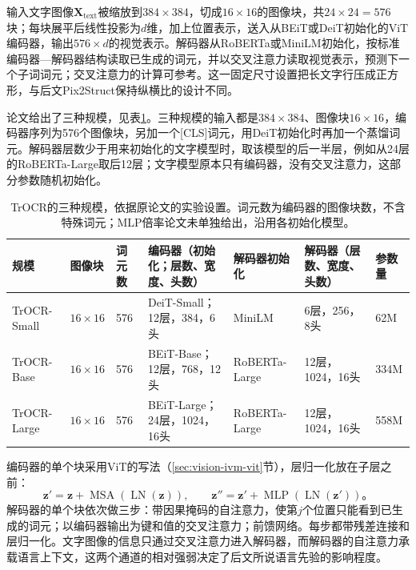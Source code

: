 输入文字图像$\bm X_{\mathrm{text}}$被缩放到$384\times384$，切成$16\times16$的图像块，共$24\times24=576$块；每块展平后线性投影为$d$维，加上位置表示，送入从BEiT或DeiT初始化的ViT编码器，输出$576\times d$的视觉表示。解码器从RoBERTa或MiniLM初始化，按标准编码器—解码器结构读取已生成的词元，并以交叉注意力读取视觉表示，预测下一个子词词元；交叉注意力的计算可参考。这一固定尺寸设置把长文字行压成正方形，与后文Pix2Struct保持纵横比的设计不同。

论文给出了三种规模，见表\ref{tab:vision-understanding-trocr-config}。三种规模的输入都是$384\times384$、图像块$16\times16$，编码器序列为576个图像块，另加一个[CLS]词元，用DeiT初始化时再加一个蒸馏词元。解码器层数少于用来初始化的文字模型时，取该模型的后一半层，例如从24层的RoBERTa-Large取后12层；文字模型原本只有编码器，没有交叉注意力，这部分参数随机初始化。

\begin{table}[tbp]
  \centering
  \small
  \begin{tabularx}{\linewidth}{@{}p{16mm}p{14mm}p{12mm}Xp{18mm}Xp{14mm}@{}}
    \toprule
    规模 & 图像块 & 词元数 & 编码器（初始化；层数、宽度、头数） & 解码器初始化 & 解码器（层数、宽度、头数） & 参数量\\
    \midrule
    TrOCR-Small & $16\times16$ & 576 & DeiT-Small；12层，384，6头 & MiniLM & 6层，256，8头 & 62M\\
    TrOCR-Base & $16\times16$ & 576 & BEiT-Base；12层，768，12头 & RoBERTa-Large & 12层，1024，16头 & 334M\\
    TrOCR-Large & $16\times16$ & 576 & BEiT-Large；24层，1024，16头 & RoBERTa-Large & 12层，1024，16头 & 558M\\
    \bottomrule
  \end{tabularx}
  \caption{TrOCR的三种规模，依据原论文的实验设置。词元数为编码器的图像块数，不含特殊词元；MLP倍率论文未单独给出，沿用各初始化模型。}
  \label{tab:vision-understanding-trocr-config}
\end{table}

编码器的单个块采用ViT的写法（\ref{sec:vision-ivm-vit}节），层归一化放在子层之前：
\[
  \bm z'=\bm z+\operatorname{MSA}(\operatorname{LN}(\bm z)),\qquad
  \bm z''=\bm z'+\operatorname{MLP}(\operatorname{LN}(\bm z'))\text{。}
\]
解码器的单个块依次做三步：带因果掩码的自注意力，使第$j$个位置只能看到已生成的词元；以编码器输出为键和值的交叉注意力；前馈网络。每步都带残差连接和层归一化。文字图像的信息只通过交叉注意力进入解码器，而解码器的自注意力承载语言上下文，这两个通道的相对强弱决定了后文所说语言先验的影响程度。

